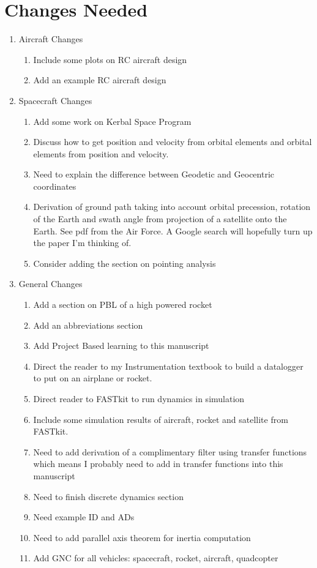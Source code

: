 \documentclass{article}
\begin{document}
\section*{Changes Needed}

\begin{enumerate}[itemsep=-5pt]
  \item Aircraft Changes
    \begin{enumerate}[itemsep=-5pt]
    \item Include some plots on RC aircraft design
    \item Add an example RC aircraft design
    \end{enumerate}
\item Spacecraft Changes
  \begin{enumerate}[itemsep=-5pt]
  \item Add some work on Kerbal Space Program
  \item Discuss how to get position and velocity from orbital elements and orbital elements
    from position and velocity.
  \item Need to explain the difference between Geodetic and Geocentric
    coordinates
  \item Derivation of ground path taking into account orbital
    precession, rotation of the Earth and swath angle from projection of
    a satellite onto the Earth. See pdf from the Air Force. A Google
    search will hopefully turn up the paper I'm thinking of.
  \item Consider adding the section on pointing analysis
  \end{enumerate}
\item General Changes
  \begin{enumerate}[itemsep=-5pt]
  \item Add a section on PBL of a high powered rocket
  \item Add an abbreviations section
  \item Add Project Based learning to this manuscript
  \item Direct the reader to my Instrumentation textbook to build a
    datalogger to put on an airplane or rocket.
  \item Direct reader to FASTkit to run dynamics in simulation
  \item Include some simulation results of aircraft, rocket and
    satellite from FASTkit.
  \item Need to add derivation of a complimentary filter using
    transfer functions which means I probably need to add in transfer
    functions into this manuscript
  \item Need to finish discrete dynamics section
  \item Need example ID and ADs
  \item Need to add parallel axis theorem for inertia computation
  \item Add GNC for all vehicles: spacecraft, rocket, aircraft, quadcopter
  \end{enumerate}
\end{enumerate}
\end{document}
